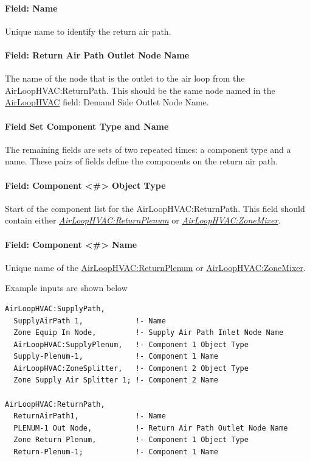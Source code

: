 \paragraph{Field: Name}\label{field-name-1-002}

Unique name to identify the return air path.

\paragraph{Field: Return Air Path Outlet Node Name}\label{field-return-air-path-outlet-node-name}

The name of the node that is the outlet to the air loop from the AirLoopHVAC:ReturnPath. This should be the same node named in the \hyperref[airloophvac]{AirLoopHVAC} field: Demand Side Outlet Node Name.

\paragraph{Field Set Component Type and Name}\label{field-set-component-type-and-name-1}

The remaining fields are sets of two repeated times: a component type and a name. These pairs of fields define the components on the return air path.

\paragraph{Field: Component \textless{}\#\textgreater{} Object Type}\label{field-component-object-type-1}

Start of the component list for the AirLoopHVAC:ReturnPath. This field should contain either \emph{\hyperref[airloophvacreturnplenum]{AirLoopHVAC:ReturnPlenum}} or \emph{\hyperref[airloophvaczonemixer]{AirLoopHVAC:ZoneMixer}}.

\paragraph{Field: Component \textless{}\#\textgreater{} Name}\label{field-component-name-1}

Unique name of the \hyperref[airloophvacreturnplenum]{AirLoopHVAC:ReturnPlenum} or \hyperref[airloophvaczonemixer]{AirLoopHVAC:ZoneMixer}.

Example inputs are shown below

\begin{lstlisting}
AirLoopHVAC:SupplyPath,
  SupplyAirPath 1,            !- Name
  Zone Equip In Node,         !- Supply Air Path Inlet Node Name
  AirLoopHVAC:SupplyPlenum,   !- Component 1 Object Type
  Supply-Plenum-1,            !- Component 1 Name
  AirLoopHVAC:ZoneSplitter,   !- Component 2 Object Type
  Zone Supply Air Splitter 1; !- Component 2 Name

AirLoopHVAC:ReturnPath,
  ReturnAirPath1,             !- Name
  PLENUM-1 Out Node,          !- Return Air Path Outlet Node Name
  Zone Return Plenum,         !- Component 1 Object Type
  Return-Plenum-1;            !- Component 1 Name
\end{lstlisting}

